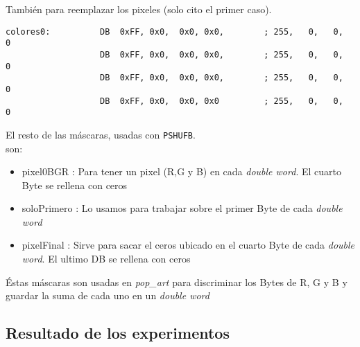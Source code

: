Tambi\'en para reemplazar los pixeles (solo cito el primer caso).
\begin{codesnippet}
\begin{verbatim}
colores0:          DB  0xFF, 0x0,  0x0, 0x0,        ; 255,   0,   0,   0
                   DB  0xFF, 0x0,  0x0, 0x0,        ; 255,   0,   0,   0
                   DB  0xFF, 0x0,  0x0, 0x0,        ; 255,   0,   0,   0
                   DB  0xFF, 0x0,  0x0, 0x0         ; 255,   0,   0,   0

\end{verbatim}
\end{codesnippet}
El resto de las m\'ascaras, usadas con \verb|PSHUFB|.\\ son:

\begin{itemize}
	\item pixel0BGR : Para tener un pixel (R,G y B) en cada \textit{double word}. El cuarto Byte se rellena con ceros
			
	\item soloPrimero : Lo usamos para trabajar sobre el primer Byte de cada \textit{double word}
		
	\item pixelFinal : Sirve para sacar el ceros ubicado en el cuarto Byte de cada \textit{double word}. El ultimo DB se rellena con ceros
\end{itemize}
\'Estas m\'ascaras son usadas en \textit{pop_art} para discriminar los Bytes de R, G y B y guardar la suma de cada uno en un \textit{double word}

\subsection{Resultado de los experimentos}


